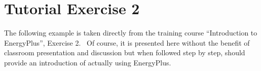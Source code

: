 \chapter{Tutorial Exercise 2}\label{tutorial-exercise-2}

The following example is taken directly from the training course ``Introduction to EnergyPlus'', Exercise 2.~ Of course, it is presented here without the benefit of classroom presentation and discussion but when followed step by step, should provide an introduction of actually using EnergyPlus.
